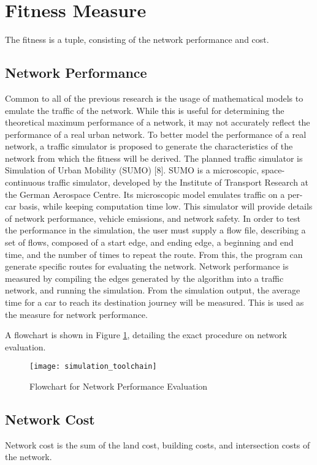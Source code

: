 \documentclass[11pt, oneside, notitlepage, final]{article}
\begin{document}
    \section{Fitness Measure}
        The fitness is a tuple, consisting of the network performance and cost. 

        \subsection{Network Performance}
            Common to all of the previous research is the usage of mathematical models to emulate the traffic of the network. While this is useful for determining the theoretical maximum performance of a network, it may not accurately reflect the performance of a real urban network. To better model the performance of a real network, a traffic simulator is proposed to generate the characteristics of the network from which the fitness will be derived. The planned traffic simulator is Simulation of Urban Mobility (SUMO) [8].  SUMO is a microscopic, space-continuous traffic simulator, developed by the Institute of Transport Research at the German Aerospace Centre. Its microscopic model emulates traffic on a per-car basis, while keeping computation time low. This simulator will provide details of network performance, vehicle emissions, and network safety.
            In order to test the performance in the simulation, the user must supply a flow file, describing a set of flows, composed of a start edge, and ending edge, a beginning and end time, and the number of times to repeat the route. From this, the program can generate specific routes for evaluating the network.
            Network performance is measured by compiling the edges generated by the algorithm into a traffic network, and running the simulation. From the simulation output, the average time for a car to reach its destination journey will be measured. This is used as the measure for network performance.

            A flowchart is shown in Figure \ref{fig:sumo}, detailing the exact procedure on network evaluation.

            \begin{figure}[h!]
            \label{fig:sumo}
            \centering
            \texttt{[image: simulation\_toolchain]}
            \caption{Flowchart for Network Performance Evaluation}
            \end{figure}

        \subsection{Network Cost}
            Network cost is the sum of the land cost, building costs, and intersection costs of the network.
\end{document}
